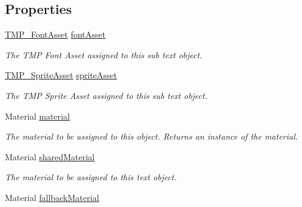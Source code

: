 \subsection*{Properties}
\begin{DoxyCompactItemize}
\item 
\mbox{\hyperlink{class_t_m_pro_1_1_t_m_p___font_asset}{T\+M\+P\+\_\+\+Font\+Asset}} \mbox{\hyperlink{class_t_m_pro_1_1_t_m_p___sub_mesh_a964077af399140595270238950a3b931}{font\+Asset}}
\begin{DoxyCompactList}\small\item\em The T\+MP Font Asset assigned to this sub text object. \end{DoxyCompactList}\item 
\mbox{\hyperlink{class_t_m_pro_1_1_t_m_p___sprite_asset}{T\+M\+P\+\_\+\+Sprite\+Asset}} \mbox{\hyperlink{class_t_m_pro_1_1_t_m_p___sub_mesh_ab5d0012cbff2dc1c416559cc6cf840ec}{sprite\+Asset}}
\begin{DoxyCompactList}\small\item\em The T\+MP Sprite Asset assigned to this sub text object. \end{DoxyCompactList}\item 
Material \mbox{\hyperlink{class_t_m_pro_1_1_t_m_p___sub_mesh_ad2670c4fc01057065ace1cbd7e48aa62}{material}}
\begin{DoxyCompactList}\small\item\em The material to be assigned to this object. Returns an instance of the material. \end{DoxyCompactList}\item 
Material \mbox{\hyperlink{class_t_m_pro_1_1_t_m_p___sub_mesh_ac9177ee19f2dc7501888f62ad5c8798d}{shared\+Material}}
\begin{DoxyCompactList}\small\item\em The material to be assigned to this text object. \end{DoxyCompactList}\item 
Material \mbox{\hyperlink{class_t_m_pro_1_1_t_m_p___sub_mesh_ab77df446a9272aeb7b29e189ed42d408}{fallback\+Material}}

\end{DoxyCompactItemize}

